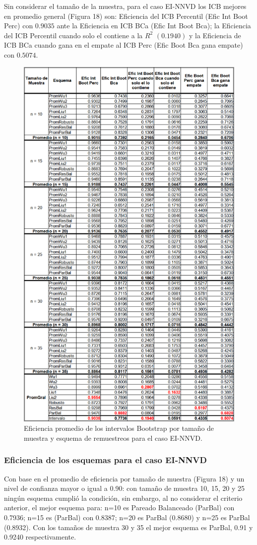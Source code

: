 Sin considerar el tamaño de la muestra, para el caso EI-NNVD los ICB mejores en promedio general (Figura 18) son: Eficiencia del ICB Percentil (Efic Int Boot Perc) con $0.9035$ ante la Eficiencia en ICB BCa (Efic Int Boot Bca); la Eficiencia del ICB Percentil cuando solo el contiene a la $R^{2}$ $(0.1940)$ y la Eficiencia de ICB BCa cuando gana en el empate al ICB Perc (Efic Boot Bca gana empate) con $0.5074$.

\begin{figure}[ht] 
	\centering 
	\includegraphics[width=0.55\linewidth]{img/EI_NNVD_Efic_Boots.png} 
	\caption{Eficiencia promedio de los intervalos Bootstrap por tamaño de muestra y esquema de remuestreos para el caso EI-NNVD.} 
	\label{fig:EI_NNVD_Boots}
\end{figure}
\FloatBarrier

\subsubsection{Eficiencia de los esquemas para el caso EI-NNVD}
Con base en el promedio de eficiencia por tamaño de muestra (Figura 18) y un nivel de confianza mayor o igual a 0.90: con tamaño de muestra 10, 15, 20 y 25 ningún esquema cumplió la condición, sin embargo, al no considerar el criterio anterior, el mejor esquema para: n=10 es Pareado Balanceado (ParBal) con 0.7936; n=15 es (ParBal) con 0.8387;  n=20 es ParBal (0.8680) y  n=25 es ParBal (0.8932). Con los tamaños de muestra 30 y 35 el mejor esquema es ParBal, 0.91 y 0.9240 respectivamente.
\vspace{.5cm}

